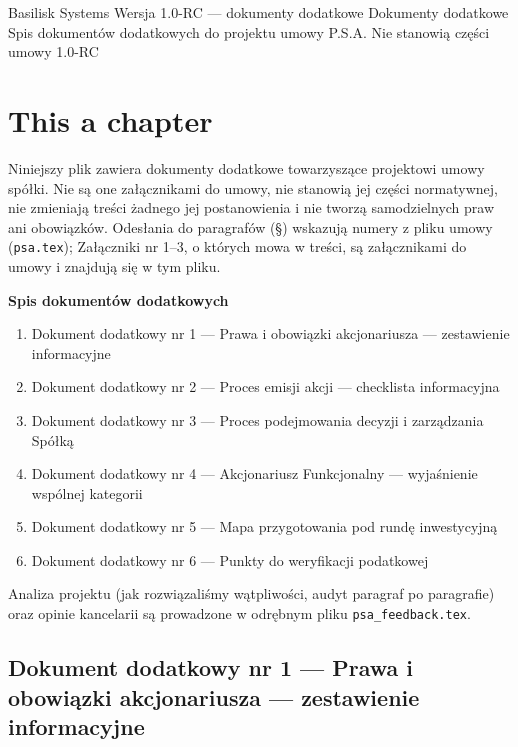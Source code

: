 \documentclass[12pt,a4paper]{report}
\newcounter{paragraf}
\begin{document}
\BusinessPlanTitlePage
  {Basilisk Systems}
  {Wersja 1.0-RC --- dokumenty dodatkowe}
  {Dokumenty dodatkowe}
  {Spis dokumentów dodatkowych do projektu umowy P.S.A.}
  {Nie stanowią części umowy}
  {1.0-RC}

\tableofcontents
\newpage

\chapter{This a chapter}

Niniejszy plik zawiera dokumenty dodatkowe towarzyszące projektowi umowy spółki. Nie są one załącznikami do umowy, nie stanowią jej części normatywnej, nie zmieniają treści żadnego jej postanowienia i nie tworzą samodzielnych praw ani obowiązków. Odesłania do paragrafów (§) wskazują numery z pliku umowy (\texttt{psa.tex}); Załączniki nr 1--3, o których mowa w treści, są załącznikami do umowy i znajdują się w tym pliku.

\textbf{Spis dokumentów dodatkowych}
\begin{enumerate}
  \item Dokument dodatkowy nr 1 — Prawa i obowiązki akcjonariusza — zestawienie informacyjne
  \item Dokument dodatkowy nr 2 — Proces emisji akcji — checklista informacyjna
  \item Dokument dodatkowy nr 3 — Proces podejmowania decyzji i zarządzania Spółką
  \item Dokument dodatkowy nr 4 — Akcjonariusz Funkcjonalny — wyjaśnienie wspólnej kategorii
  \item Dokument dodatkowy nr 5 — Mapa przygotowania pod rundę inwestycyjną
  \item Dokument dodatkowy nr 6 — Punkty do weryfikacji podatkowej
\end{enumerate}

Analiza projektu (jak rozwiązaliśmy wątpliwości, audyt paragraf po paragrafie) oraz opinie kancelarii są prowadzone w odrębnym pliku \texttt{psa\_feedback.tex}.

\clearpage
\section*{Dokument dodatkowy nr 1 — Prawa i obowiązki akcjonariusza — zestawienie informacyjne}
\label{annex:obowiazki-akcjonariusza}
\end{document}
